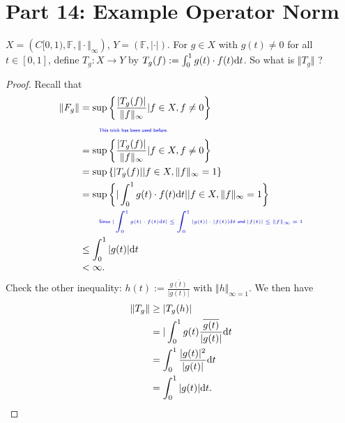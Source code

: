 \documentclass[../../note.tex]{subfiles}
\begin{document}

\section{Part 14: Example Operator Norm}
\begin{example}
    $X = \left(C[0,1), \mathbb{F}, \Vert \cdot \Vert_{\infty}\right)$, $Y = \left(\mathbb{F}, \vert \cdot \vert \right)$. 
    For $g \in X$ with $g(t) \neq 0$ for all $t \in [0,1]$, define $T_g: X \rightarrow Y$ by $T_g(f):= \int_{0}^{1} g(t) \cdot f(t) {\rm d}t$. So what is $\Vert T_g \Vert$ ?
    \begin{proof}
    Recall that 
    \begin{align}
        \Vert F_g \Vert
        &= \sup\left\{\frac{\vert T_g(f) \vert}{\Vert f \Vert_{\infty}} \vert f \in X, f \neq 0 \right\} \\
        &\qquad\text{\color{blue}{\tiny\sffamily This trick has been used before.}} \nonumber \\
        &= \sup\left\{\frac{\vert T_g(f) \vert}{\Vert f \Vert_{\infty}} \vert f \in X, f \neq 0 \right\} \\
        &= \sup\left\{{\vert T_g(f) \vert} \vert f \in X, \Vert f \Vert_{\infty} = 1 \right\} \\
        &= \sup\left\{\vert \int_{0}^{1} g(t) \cdot f(t){\rm d}t \vert \vert f \in X, \Vert f \Vert_{\infty} = 1 \right\} \\
        &\qquad\text{\color{blue}{\tiny\sffamily Since $\vert \int_{0}^{1}g(t)\cdot f(t){\rm d}t \vert \leq \int_{0}^{1}\vert g(t) \vert \cdot \vert f(t) \vert{\rm d}t $ and $\vert f(t) \vert \leq \Vert f \Vert_{\infty}=1$}} \nonumber \\
        &\leq \int_{0}^{1} \vert g(t) \vert {\rm d}t \\
        &< \infty.
    \end{align}
    Check the other inequality: $h(t):= \frac{\overline{g(t)}}{\vert g(t) \vert}$ with $\Vert h \Vert_{\infty = 1}$. We then have
    \begin{align}
        \Vert T_g \Vert 
        &\geq \vert T_g(h) \vert \\
        &= \vert \int_{0}^{1} g(t) \frac{\overline{g(t)}}{\vert g(t) \vert} {\rm d}t \\
        &= \int_0^1 \frac{\vert g(t) \vert^2}{\vert g(t) \vert}{\rm d}t \\
        &= \int_0^1 \vert g(t) \vert{\rm d}t.
    \end{align}
    \end{proof}
\end{example}
\end{document}
